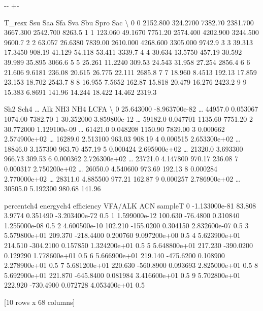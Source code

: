 \documentclass[a4paper,10pt,english]{sphinxmanual}
\newlength\nbsphinxcodecellspacing
\begin{document}
{

\kern-\sphinxverbatimsmallskipamount\kern-\baselineskip
\kern+\FrameHeightAdjust\kern-\fboxrule
\vspace{\nbsphinxcodecellspacing}

\begin{sphinxVerbatim}[commandchars=\\\{\}]
\llap{\color{nbsphinxout}[7]:\,\hspace{\fboxrule}\hspace{\fboxsep}}   T\_resx      Ssu       Saa      Sfa       Sva       Sbu      Spro     Sac   \textbackslash{}
0       0  2152.800  324.2700  7382.70  2381.700  3667.300  2542.700  8263.5
1       1   123.060   49.1670  7751.20  2574.400  4202.900  3244.500  9600.7
2       2    63.057   26.6380  7839.00  2610.000  4268.600  3305.000  9742.9
3       3    39.313   17.3450   908.19    41.129    54.118    53.411  3339.7
4       4    30.634   13.5750   457.19    30.592    39.989    35.895  3066.6
5       5    25.261   11.2240   309.53    24.543    31.958    27.254  2856.4
6       6    21.606    9.6181   236.08    20.615    26.775    22.111  2685.8
7       7    18.960    8.4513   192.13    17.859    23.153    18.702  2543.7
8       8    16.955    7.5652   162.87    15.818    20.479    16.276  2423.2
9       9    15.383    6.8691   141.96    14.244    18.422    14.462  2319.3

        Sh2          Sch4   {\ldots}     Alk       NH3      NH4     LCFA   \textbackslash{}
0  25.643000 -8.963700e-82  {\ldots}  44957.0  0.053067  1074.00  7382.70
1  30.352000  3.859800e-12  {\ldots}  59182.0  0.047701  1135.60  7751.20
2  30.772000  1.129100e-09  {\ldots}  61421.0  0.048208  1150.90  7839.00
3   0.000662  2.574900e+02  {\ldots}  16289.0  2.513100   963.03   908.19
4   0.000515  2.653300e+02  {\ldots}  18846.0  3.157300   963.70   457.19
5   0.000424  2.695900e+02  {\ldots}  21320.0  3.693300   966.73   309.53
6   0.000362  2.726300e+02  {\ldots}  23721.0  4.147800   970.17   236.08
7   0.000317  2.750200e+02  {\ldots}  26050.0  4.540600   973.69   192.13
8   0.000284  2.770000e+02  {\ldots}  28311.0  4.885500   977.21   162.87
9   0.000257  2.786900e+02  {\ldots}  30505.0  5.192300   980.68   141.96

    percentch4    energych4   efficiency   VFA/ALK           ACN  sampleT
0 -1.133000e-81       83.808      3.9774  0.351490 -3.203400e-72      0.5
1  1.599000e-12      100.630    -76.4800  0.310840  1.255000e-08      0.5
2  4.600500e-10      102.210   -155.0200  0.304150  2.832600e-07      0.5
3  5.579800e+01      209.370   -218.4400  0.200760  9.097200e+00      0.5
4  5.623900e+01      214.510   -304.2100  0.157850  1.324200e+01      0.5
5  5.648800e+01      217.230   -390.0200  0.129290  1.778600e+01      0.5
6  5.666900e+01      219.140   -475.6200  0.108900  2.278900e+01      0.5
7  5.681200e+01      220.630   -560.8900  0.093693  2.825000e+01      0.5
8  5.692900e+01      221.870   -645.8400  0.081984  3.416600e+01      0.5
9  5.702800e+01      222.920   -730.4900  0.072728  4.053400e+01      0.5

[10 rows x 68 columns]
\end{sphinxVerbatim}
}
\end{document}
